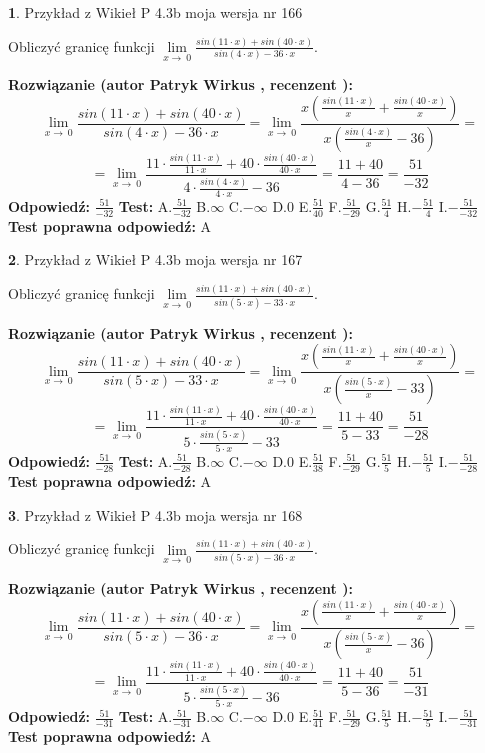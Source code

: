 \documentclass[12pt, a4paper]{article}
\theoremstyle{definition} %
\newtheorem{zad}{}
\newcommand{\zadStart}[1]{\begin{zad}#1\newline}
\newcommand{\zadStop}{\end{zad}}
\newcommand{\rozwStart}[2]{\noindent \textbf{Rozwiązanie (autor #1 , recenzent #2): }\newline}
\newcommand{\rozwStop}{\newline}
\newcommand{\odpStart}{\noindent \textbf{Odpowiedź:}\newline}
\newcommand{\odpStop}{\newline}
\newcommand{\testStart}{\noindent \textbf{Test:}\newline}
\newcommand{\testStop}{\newline}
\newcommand{\kluczStart}{\noindent \textbf{Test poprawna odpowiedź:}\newline}
\newcommand{\kluczStop}{\newline}
\begin{document}
\zadStart{Przykład z Wikieł P 4.3b moja wersja nr 166}


Obliczyć granicę funkcji $\lim\limits_{x\to\ 0}\frac{sin(11 \cdot x)+sin(40 \cdot x)}{sin(4 \cdot x)-36 \cdot x}$.
\zadStop
\rozwStart{Patryk Wirkus}{}
$$\lim\limits_{x\to\ 0}\frac{sin(11 \cdot x)+sin(40 \cdot x)}{sin(4 \cdot x)-36 \cdot x}=\lim\limits_{x\to\ 0}\frac{x(\frac{sin(11 \cdot x)}{x}+\frac{sin(40 \cdot x)}{x})}{x(\frac{sin(4 \cdot x)}{x}-36)}=$$
$$=\lim\limits_{x\to\ 0}\frac{11 \cdot \frac{sin(11 \cdot x)}{11 \cdot x}+40 \cdot \frac{sin(40 \cdot x)}{40 \cdot x}}{4 \cdot \frac{sin(4 \cdot x)}{4 \cdot x}-36}=\frac{11+40}{4-36} = \frac{51}{-32}$$
\rozwStop
\odpStart
$\frac{51}{-32}$
\odpStop
\testStart
A.$\frac{51}{-32}$
B.$\infty$
C.$-\infty$
D.$0$
E.$\frac{51}{40}$
F.$\frac{51}{-29}$
G.$\frac{51}{4}$
H.$-\frac{51}{4}$
I.$-\frac{51}{-32}$
\testStop
\kluczStart
A
\kluczStop



\zadStart{Przykład z Wikieł P 4.3b moja wersja nr 167}


Obliczyć granicę funkcji $\lim\limits_{x\to\ 0}\frac{sin(11 \cdot x)+sin(40 \cdot x)}{sin(5 \cdot x)-33 \cdot x}$.
\zadStop
\rozwStart{Patryk Wirkus}{}
$$\lim\limits_{x\to\ 0}\frac{sin(11 \cdot x)+sin(40 \cdot x)}{sin(5 \cdot x)-33 \cdot x}=\lim\limits_{x\to\ 0}\frac{x(\frac{sin(11 \cdot x)}{x}+\frac{sin(40 \cdot x)}{x})}{x(\frac{sin(5 \cdot x)}{x}-33)}=$$
$$=\lim\limits_{x\to\ 0}\frac{11 \cdot \frac{sin(11 \cdot x)}{11 \cdot x}+40 \cdot \frac{sin(40 \cdot x)}{40 \cdot x}}{5 \cdot \frac{sin(5 \cdot x)}{5 \cdot x}-33}=\frac{11+40}{5-33} = \frac{51}{-28}$$
\rozwStop
\odpStart
$\frac{51}{-28}$
\odpStop
\testStart
A.$\frac{51}{-28}$
B.$\infty$
C.$-\infty$
D.$0$
E.$\frac{51}{38}$
F.$\frac{51}{-29}$
G.$\frac{51}{5}$
H.$-\frac{51}{5}$
I.$-\frac{51}{-28}$
\testStop
\kluczStart
A
\kluczStop



\zadStart{Przykład z Wikieł P 4.3b moja wersja nr 168}


Obliczyć granicę funkcji $\lim\limits_{x\to\ 0}\frac{sin(11 \cdot x)+sin(40 \cdot x)}{sin(5 \cdot x)-36 \cdot x}$.
\zadStop
\rozwStart{Patryk Wirkus}{}
$$\lim\limits_{x\to\ 0}\frac{sin(11 \cdot x)+sin(40 \cdot x)}{sin(5 \cdot x)-36 \cdot x}=\lim\limits_{x\to\ 0}\frac{x(\frac{sin(11 \cdot x)}{x}+\frac{sin(40 \cdot x)}{x})}{x(\frac{sin(5 \cdot x)}{x}-36)}=$$
$$=\lim\limits_{x\to\ 0}\frac{11 \cdot \frac{sin(11 \cdot x)}{11 \cdot x}+40 \cdot \frac{sin(40 \cdot x)}{40 \cdot x}}{5 \cdot \frac{sin(5 \cdot x)}{5 \cdot x}-36}=\frac{11+40}{5-36} = \frac{51}{-31}$$
\rozwStop
\odpStart
$\frac{51}{-31}$
\odpStop
\testStart
A.$\frac{51}{-31}$
B.$\infty$
C.$-\infty$
D.$0$
E.$\frac{51}{41}$
F.$\frac{51}{-29}$
G.$\frac{51}{5}$
H.$-\frac{51}{5}$
I.$-\frac{51}{-31}$
\testStop
\kluczStart
A
\kluczStop
\end{document}
